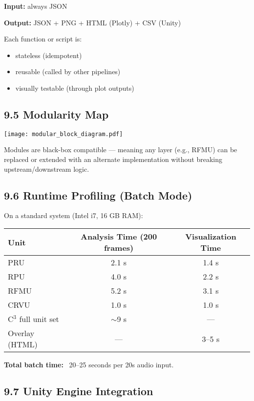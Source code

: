 \textbf{Input:} always JSON

\textbf{Output:} JSON + PNG + HTML (Plotly) + CSV (Unity)

Each function or script is:

\begin{itemize}
    \item stateless (idempotent)
    \item reusable (called by other pipelines)
    \item visually testable (through plot outputs)
\end{itemize}

\subsection*{9.5 Modularity Map}

\begin{center}
\texttt{[image: modular\_block\_diagram.pdf]}
\end{center}

Modules are black-box compatible — meaning any layer (e.g., RFMU) can be replaced or extended with an alternate implementation without breaking upstream/downstream logic.

\subsection*{9.6 Runtime Profiling (Batch Mode)}

On a standard system (Intel i7, 16 GB RAM):

\begin{center}
\begin{tabular}{|l|c|c|}
\hline
\textbf{Unit} & \textbf{Analysis Time (200 frames)} & \textbf{Visualization Time} \\
\hline
PRU & 2.1 s & 1.4 s \\
RPU & 4.0 s & 2.2 s \\
RFMU & 5.2 s & 3.1 s \\
CRVU & 1.0 s & 1.0 s \\
C$^3$ full unit set & $\sim$9 s & — \\
Overlay (HTML) & — & 3–5 s \\
\hline
\end{tabular}
\end{center}

\textbf{Total batch time:} ~20–25 seconds per 20s audio input.

\subsection*{9.7 Unity Engine Integration}

